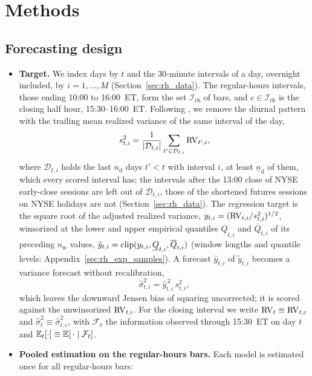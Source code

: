 

\section{Methods}
\label{sec:rh_methods}

\subsection{Forecasting design}
\label{sec:rh_methods_setup}
\begin{itemize}
\item \textbf{Target.} We index days by $t$ and the 30-minute intervals of a day, overnight included, by
  $i = 1, \dots, M$ (Section~\ref{sec:rh_data}). The regular-hours intervals, those ending 10:00 to 16:00~ET, form the
  set $\mathcal I_{\mathrm{rh}}$ of \rhorNBars{} bars, and $c \in \mathcal I_{\mathrm{rh}}$ is the closing half hour,
  15:30--16:00~ET. Following \citet{AndersenBollerslev1997}, we remove the diurnal pattern with the trailing mean
  realized variance of the same interval of the day,
  \[
    s^2_{t,i} = \frac{1}{|\mathcal D_{t,i}|}\sum_{t' \in \mathcal D_{t,i}} \mathrm{RV}_{t',i},
  \]
  where $\mathcal D_{t,i}$ holds the last $n_{\mathrm{d}}$ days $t' < t$ with interval $i$, at least
  $\underline n_{\mathrm{d}}$ of them, which every scored interval has; the intervals after the 13:00 close of NYSE
  early-close sessions are left out of $\mathcal D_{t,i}$, those of the shortened futures sessions on NYSE holidays
  are not (Section~\ref{sec:rh_data}). The regression target is the square root of the adjusted
  realized variance, $y_{t,i} = (\mathrm{RV}_{t,i}/s^2_{t,i})^{1/2}$, winsorized at the lower and upper empirical quantiles
  $\underline Q_{t,i}$ and $\overline Q_{t,i}$ of its preceding $n_{\mathrm{w}}$ values,
  $\tilde y_{t,i} = \operatorname{clip}(y_{t,i}, \underline Q_{t,i}, \overline Q_{t,i})$ (window lengths and quantile levels:
  Appendix~\ref{sec:rh_exp_samples}). A forecast $\hat y_{t,i}$ of $\tilde y_{t,i}$ becomes a variance forecast
  without recalibration,
  \[
    \hat\sigma^2_{t,i} = \hat y_{t,i}^{\,2}\, s^2_{t,i},
  \]
  which leaves the downward Jensen bias of squaring uncorrected; it is scored against the unwinsorized $\mathrm{RV}_{t,i}$.
  For the closing interval we write $\mathrm{RV}_t \equiv \mathrm{RV}_{t,c}$ and $\hat\sigma^2_t \equiv \hat\sigma^2_{t,c}$, with
  $\mathcal F_t$ the information observed through 15:30~ET on day $t$ and
  $\mathbb{E}_t[\cdot] \equiv \mathbb{E}[\,\cdot \mid \mathcal F_t]$.
\item \textbf{Pooled estimation on the regular-hours bars.} Each model is estimated once for all regular-hours bars:

\end{itemize}
